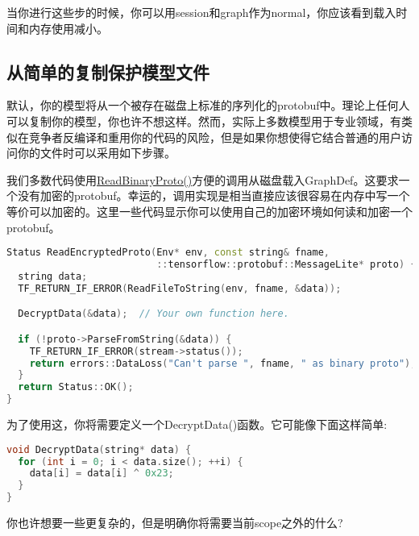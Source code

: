 当你进行这些步的时候，你可以用session和graph作为normal，你应该看到载入时间和内存使用减小。

\subsection{从简单的复制保护模型文件}
默认，你的模型将从一个被存在磁盘上标准的序列化的protobuf中。理论上任何人可以复制你的模型，你也许不想这样。然而，实际上多数模型用于专业领域，有类似在竞争者反编译和重用你的代码的风险，但是如果你想使得它结合普通的用户访问你的文件时可以采用如下步骤。

我们多数代码使用\href{https://www.github.com/tensorflow/tensorflow/blob/r1.4/tensorflow/core/platform/env.cc?q=core/platform/env.cc&l=409}{ReadBinaryProto()}方便的调用从磁盘载入GraphDef。这要求一个没有加密的protobuf。幸运的，调用实现是相当直接应该很容易在内存中写一个等价可以加密的。这里一些代码显示你可以使用自己的加密环境如何读和加密一个protobuf。
\begin{lstlisting}[language=C++]
Status ReadEncryptedProto(Env* env, const string& fname,
                          ::tensorflow::protobuf::MessageLite* proto) {
  string data;
  TF_RETURN_IF_ERROR(ReadFileToString(env, fname, &data));

  DecryptData(&data);  // Your own function here.

  if (!proto->ParseFromString(&data)) {
    TF_RETURN_IF_ERROR(stream->status());
    return errors::DataLoss("Can't parse ", fname, " as binary proto");
  }
  return Status::OK();
}
\end{lstlisting}
为了使用这，你将需要定义一个DecryptData()函数。它可能像下面这样简单:
\begin{lstlisting}[language=C++]
void DecryptData(string* data) {
  for (int i = 0; i < data.size(); ++i) {
    data[i] = data[i] ^ 0x23;
  }
}

\end{lstlisting}
你也许想要一些更复杂的，但是明确你将需要当前scope之外的什么?

